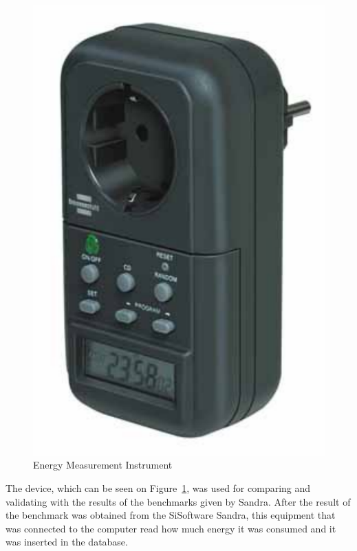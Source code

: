         \begin{figure}[htbp]
            \centering
                \includegraphics[scale=0.6]{graphics/energy_measurement_instrument}
                \caption{Energy Measurement Instrument}
                \label{fig:energy_measurement_instrument}
        \end{figure}
        The device, which can be seen on Figure~\ref{fig:energy_measurement_instrument}, was used for comparing and validating with the results of the benchmarks given by Sandra. After the result of the benchmark was obtained from the SiSoftware Sandra, this equipment that was connected to the computer read how much energy it was consumed and it was inserted in the database.
        
